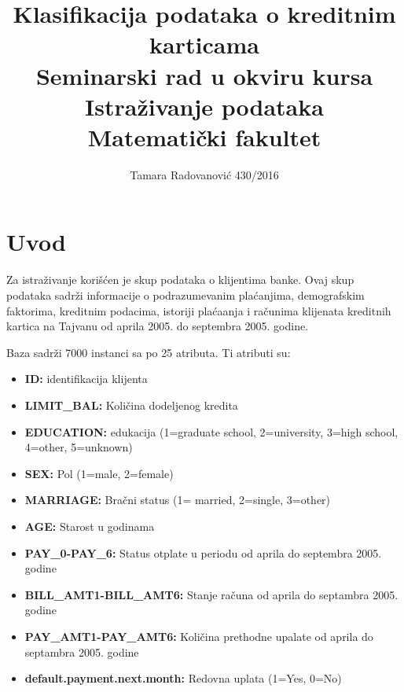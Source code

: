 \documentclass[a4paper]{article}
\begin{document}
\title{Klasifikacija podataka o kreditnim karticama\\ \small{Seminarski rad u okviru kursa\\Istraživanje podataka\\ Matematički fakultet}}

\author{Tamara Radovanović 430/2016}


\maketitle


\tableofcontents

\newpage

\section{Uvod}
\label{sec:uvod}

Za istraživanje korišćen je skup podataka o klijentima banke. Ovaj skup podataka sadrži informacije o podrazumevanim plaćanjima, demografskim faktorima, kreditnim podacima, istoriji plaćaanja i računima klijenata kreditnih kartica na Tajvanu od aprila 2005. do septembra 2005. godine.

Baza sadrži 7000 instanci sa po 25 atributa. Ti atributi su:
\begin{itemize}
	\item \textbf{ID:} identifikacija klijenta
	\item \textbf{LIMIT\_BAL:} Količina dodeljenog kredita
	\item \textbf{EDUCATION:} edukacija  (1=graduate school, 2=university, 3=high school, 4=other, 5=unknown)
	\item \textbf{SEX:} Pol (1=male, 2=female)
	\item \textbf{MARRIAGE:} Bračni status (1= married, 2=single, 3=other)
	\item \textbf{AGE:} Starost u godinama 
	\item \textbf{PAY\_0-PAY\_6:} Status otplate u periodu od aprila do septembra 2005. godine
	\item \textbf{BILL\_AMT1-BILL\_AMT6:} Stanje računa od aprila do septambra 2005. godine
	\item \textbf{PAY\_AMT1-PAY\_AMT6:} Količina prethodne upalate od aprila do septambra 2005. godine
	\item \textbf{default.payment.next.month:} Redovna uplata (1=Yes, 0=No)
\end{itemize}
\end{document}
